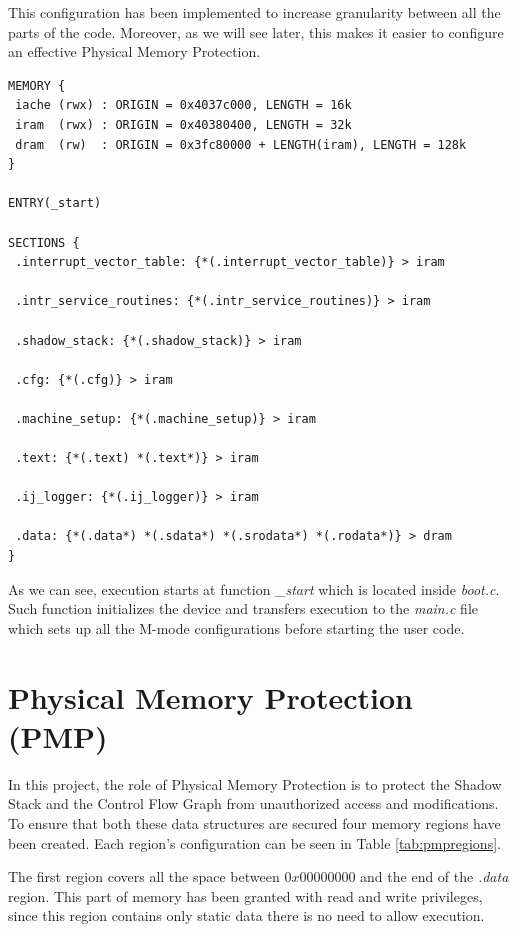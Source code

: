 This configuration has been implemented to increase granularity between all the
parts of the code. Moreover, as we will see later, this makes it easier to configure
an effective Physical Memory Protection.

\begin{lstlisting}[style=CStyle, caption= Simplified linker script, label={lst:linker}]
MEMORY {
 iache (rwx) : ORIGIN = 0x4037c000, LENGTH = 16k
 iram  (rwx) : ORIGIN = 0x40380400, LENGTH = 32k
 dram  (rw)  : ORIGIN = 0x3fc80000 + LENGTH(iram), LENGTH = 128k
}

ENTRY(_start)

SECTIONS {
 .interrupt_vector_table: {*(.interrupt_vector_table)} > iram

 .intr_service_routines: {*(.intr_service_routines)} > iram

 .shadow_stack: {*(.shadow_stack)} > iram

 .cfg: {*(.cfg)} > iram

 .machine_setup: {*(.machine_setup)} > iram

 .text: {*(.text) *(.text*)} > iram

 .ij_logger: {*(.ij_logger)} > iram

 .data: {*(.data*) *(.sdata*) *(.srodata*) *(.rodata*)} > dram
}
\end{lstlisting}

As we can see, execution starts at function \textit{\_start} which is located
inside \textit{boot.c}. Such function initializes the device and transfers
execution to the \textit{main.c} file which sets up all the M-mode configurations
before starting the user code.

\section{Physical Memory Protection (PMP)}
\label{sec:project_pmp}

In this project, the role of Physical Memory Protection is to protect the Shadow
Stack and the Control Flow Graph from unauthorized access and modifications. To
ensure that both these data structures are secured four memory regions have been
created. Each region's configuration can be seen in Table \ref{tab:pmpregions}.

The first region covers all the space between $0x00000000$ and the end of the \textit{.data}
region. This part of memory has been granted with read and write privileges,
since this region contains only static data there is no need to allow execution.


